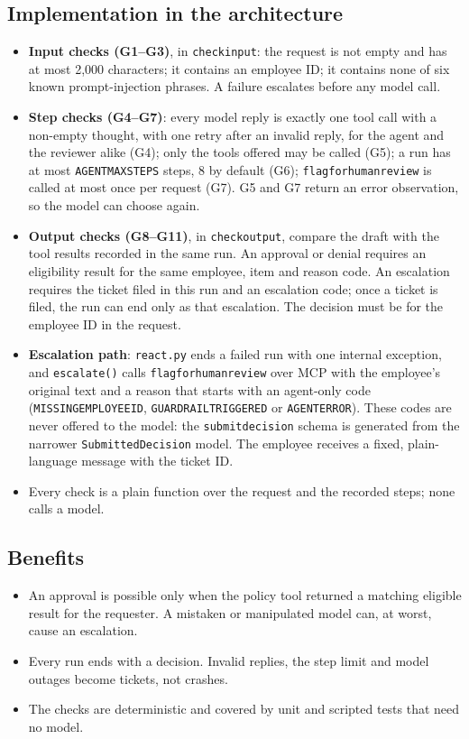 \documentclass[11pt,letterpaper]{article}
\renewcommand{\_}{\textunderscore\allowbreak}
\begin{document}
\subsection*{Implementation in the architecture}
\begin{itemize}
  \item \textbf{Input checks (G1--G3)}, in \texttt{check\_input}: the request is not empty and has
  at most 2,000 characters; it contains an employee ID; it contains none of six known
  prompt-injection phrases. A failure escalates before any model call.
  \item \textbf{Step checks (G4--G7)}: every model reply is exactly one tool call with a non-empty
  thought, with one retry after an invalid reply, for the agent and the reviewer alike (G4); only
  the tools offered may be called (G5); a run has at most \texttt{AGENT\_MAX\_STEPS} steps,
  8 by default (G6); \texttt{flag\_for\_human\_review} is called at most once per request (G7).
  G5 and G7 return an error observation, so the model can choose again.
  \item \textbf{Output checks (G8--G11)}, in \texttt{check\_output}, compare the draft with the
  tool results recorded in the same run. An approval or denial requires an eligibility result
  for the same employee, item and reason code. An escalation requires the ticket filed in this
  run and an escalation code; once a ticket is filed, the run can end only as that escalation.
  The decision must be for the employee ID in the request.
  \item \textbf{Escalation path}: \texttt{react.py} ends a failed run with one internal exception,
  and \texttt{\_escalate()} calls \texttt{flag\_for\_human\_review} over MCP with the employee's
  original text and a reason that starts with an agent-only code (\texttt{MISSING\_EMPLOYEE\_ID},
  \texttt{GUARDRAIL\_TRIGGERED} or \texttt{AGENT\_ERROR}). These codes are never offered to the
  model: the \texttt{submit\_decision} schema is generated from the narrower
  \texttt{SubmittedDecision} model. The employee receives a fixed, plain-language message with
  the ticket ID.
  \item Every check is a plain function over the request and the recorded steps; none calls a
  model.
\end{itemize}

\subsection*{Benefits}
\begin{itemize}
  \item An approval is possible only when the policy tool returned a matching eligible result for
  the requester. A mistaken or manipulated model can, at worst, cause an escalation.
  \item Every run ends with a decision. Invalid replies, the step limit and model outages become
  tickets, not crashes.
  \item The checks are deterministic and covered by unit and scripted tests that need no model.
\end{itemize}
\end{document}
